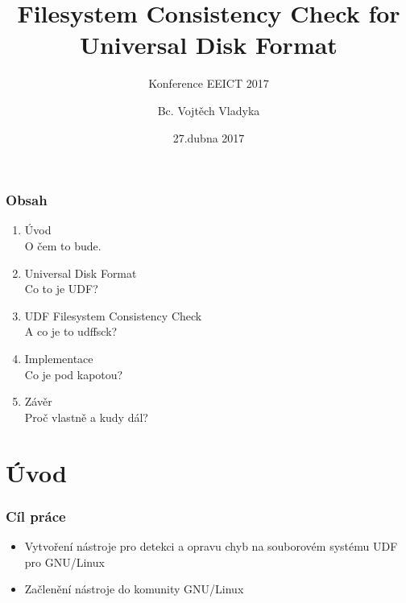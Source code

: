 \documentclass[aspectratio=169]{beamer}
\title{Filesystem Consistency Check for Universal Disk Format}
\subtitle{Konference EEICT 2017}
\author{Bc. Vojtěch Vladyka}
\date{27.dubna 2017}
\begin{document}
	\addtolength{\textwidth}{-20pt}
	\addtolength{\textheight}{-20pt}
  \frame{\titlepage}
   
  \begin{frame}
	\frametitle{Obsah}
	\vspace{40 pt}
	\begin{enumerate}
	  \Large\item Úvod
	  \\ \textcolor{ExecusharesGrey}{\footnotesize\hspace{1em}\large O čem to bude.}	
	  \Large\item Universal Disk Format
	  \\ \textcolor{ExecusharesGrey}{\footnotesize\hspace{1em}\large Co to je UDF?}
	  \Large\item UDF Filesystem Consistency Check
	  \\ \textcolor{ExecusharesGrey}{\footnotesize\hspace{1em}\large A co je to udffsck?}
	  \Large\item Implementace
	  \\ \textcolor{ExecusharesGrey}{\footnotesize\hspace{1em}\large Co je pod kapotou?}
	  \Large\item Závěr
	  \\ \textcolor{ExecusharesGrey}{\footnotesize\hspace{1em}\large Proč vlastně a kudy dál?}
	\end{enumerate}
	\end{frame}

	\section{Úvod}
		\begin{frame}
			\frametitle{Cíl práce}
			\vspace{40 pt}
			\Huge
			\begin{itemize}
				\item\Large Vytvoření nástroje pro detekci a opravu chyb na souborovém systému UDF pro GNU/Linux
				\item\Large Začlenění nástroje do komunity GNU/Linux
			\end{itemize}
		\end{frame}
\end{document}
